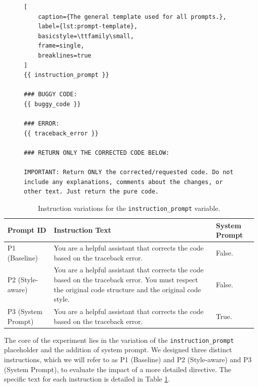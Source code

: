 \begin{figure}[h!]
\begin{lstlisting}[
    caption={The general template used for all prompts.},
    label={lst:prompt-template},
    basicstyle=\ttfamily\small,
    frame=single,
    breaklines=true
]
{{ instruction_prompt }}

### BUGGY CODE:
{{ buggy_code }}

### ERROR:
{{ traceback_error }}

### RETURN ONLY THE CORRECTED CODE BELOW:

IMPORTANT: Return ONLY the corrected/requested code. Do not include any explanations, comments about the changes, or other text. Just return the pure code.

\end{lstlisting} %
\end{figure}
\begin{table}[h!]
\centering
\caption{Instruction variations for the \texttt{instruction\_prompt} variable.}
\label{tab:prompt-instructions}
\begin{tabular}{|l|p{}|p{}|}
\hline
\textbf{Prompt ID} & \textbf{Instruction Text} & \textbf{System Prompt} \\ \hline
P1 (Baseline) & You are a helpful assistant that corrects the code based on the traceback error. & False. \\\hline
P2 (Style-aware) & You are a helpful assistant that corrects the code based on the traceback error. You must respect the original code structure and the original code style. & False. \\ \hline
P3 (System Prompt) & You are a helpful assistant that corrects the code based on the traceback error. & True. \\ \hline
\end{tabular}
\end{table}
The core of the experiment lies in the variation of the \texttt{instruction\_prompt} placeholder and the addition of system prompt. 
We designed three distinct instructions, which we will refer to as P1 (Baseline) and P2 (Style-aware) and P3 (System Prompt), 
to evaluate the impact of a more detailed directive. The specific text for each instruction 
is detailed in Table \ref{tab:prompt-instructions}.

